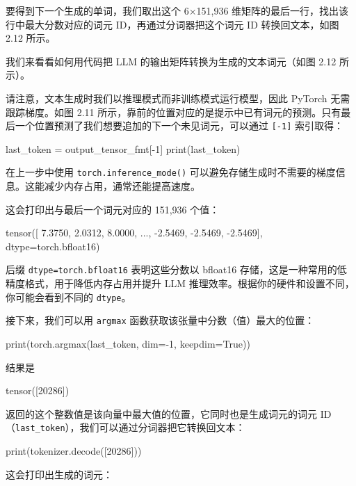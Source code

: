 要得到下一个生成的单词，我们取出这个 6×151,936 维矩阵的最后一行，找出该行中最大分数对应的词元 ID，再通过分词器把这个词元 ID 转换回文本，如图 2.12 所示。


我们来看看如何用代码把 LLM 的输出矩阵转换为生成的文本词元（如图 2.12 所示）。

请注意，文本生成时我们以推理模式而非训练模式运行模型，因此 PyTorch 无需跟踪梯度。如图 2.11 所示，靠前的位置对应的是提示中已有词元的预测。只有最后一个位置预测了我们想要追加的下一个未见词元，可以通过 \texttt{[-1]} 索引取得：

\begin{codebox}
last_token = output_tensor_fmt[-1]
print(last_token)
\end{codebox}

在上一步中使用 \texttt{torch.inference\_mode()} 可以避免存储生成时不需要的梯度信息。这能减少内存占用，通常还能提高速度。

这会打印出与最后一个词元对应的 151,936 个值：

\begin{codebox}
tensor([ 7.3750,  2.0312,  8.0000,  ..., -2.5469, -2.5469, -2.5469],
       dtype=torch.bfloat16)
\end{codebox}

后缀 \texttt{dtype=torch.bfloat16} 表明这些分数以 bfloat16 存储，这是一种常用的低精度格式，用于降低内存占用并提升 LLM 推理效率。根据你的硬件和设置不同，你可能会看到不同的 \texttt{dtype}。

接下来，我们可以用 \texttt{argmax} 函数获取该张量中分数（值）最大的位置：

\begin{codebox}
print(torch.argmax(last_token, dim=-1, keepdim=True))
\end{codebox}

结果是

\begin{codebox}
tensor([20286])
\end{codebox}

返回的这个整数值是该向量中最大值的位置，它同时也是生成词元的词元 ID（\texttt{last\_token}），我们可以通过分词器把它转换回文本：

\begin{codebox}
print(tokenizer.decode([20286]))
\end{codebox}

这会打印出生成的词元：

